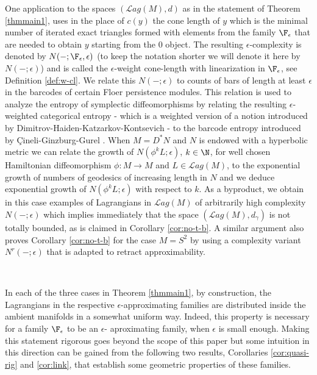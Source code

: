  One application to the spaces $(\mathcal{L}ag(M), d)$ as in the statement of 
 Theorem \ref{thmmain1},  uses in the place of $c(y)$ the cone length of $y$ which
 is  the minimal number of iterated exact triangles formed with elements from the family $\F_{\epsilon}$ that
 are needed to obtain $y$ starting from the $0$ object. The resulting $\epsilon$-complexity is denoted by 
 $N(- ; \F_{\epsilon},\epsilon)$ (to keep the notation shorter we will denote
 it here by $N(-; \epsilon)$) and is called the $\epsilon$-weight cone-length with linearization in $\F_\epsilon$, see Definition
 \ref{def:w-cl}.  We relate this $N(-;\epsilon)$ to counts of bars of length at least $\epsilon$ in the barcodes of certain Floer persistence modules. This relation is used to analyze the entropy of symplectic diffeomorphisms by relating the resulting $\epsilon$-weighted categorical entropy - which is a weighted version of a notion introduced by Dimitrov-Haiden-Katzarkov-Kontsevich \cite{DHKK:dyn_cat} -  to the barcode entropy introduced by  \c{C}ineli-Ginzburg-Gurel \cite{CGG_bar_ent}. When $M=D^{\ast}N$ and $N$ is endowed with a hyperbolic metric we can relate the growth of $N(\phi^{k}L; {\epsilon})$, $k\in\N$, for well chosen
 Hamiltonian diffeomorphism $\phi:M\to M$ and $L\in\mathcal{L}ag(M)$, to the exponential growth of numbers of geodesics of increasing length in $N$ and we deduce exponential growth of  $N(\phi^{k}L; {\epsilon})$ with respect to $k$.
 As a byproduct, we obtain in this case examples of Lagrangians in $\mathcal{L}ag(M)$ of arbitrarily high complexity $N(-;\epsilon)$ which implies immediately that the space $(\mathcal{L}ag(M),d_{\gamma})$  is not totally bounded, as is claimed in 
 Corollary \ref{cor:no-t-b}. A similar argument also proves  Corollary \ref{cor:no-t-b} for the case
 $M=S^{2}$ by using a complexity variant $N^{r}(-;\epsilon)$ that is adapted to retract approximability.

\

In each of the three  cases in Theorem \ref{thmmain1}, by construction, the Lagrangians in the respective $\epsilon$-approximating families are distributed inside the ambient manifolds in a somewhat uniform way. Indeed, this property is necessary for a family $\F_{\epsilon}$ to be an $\epsilon$- aproximating family, when
$\epsilon$ is small enough. Making this statement  rigorous goes beyond the scope of 
this paper but some intuition in this direction can be gained from the following two results,
Corollaries \ref{cor:quasi-rig} and \ref{cor:link}, that establish some geometric properties of these families.


